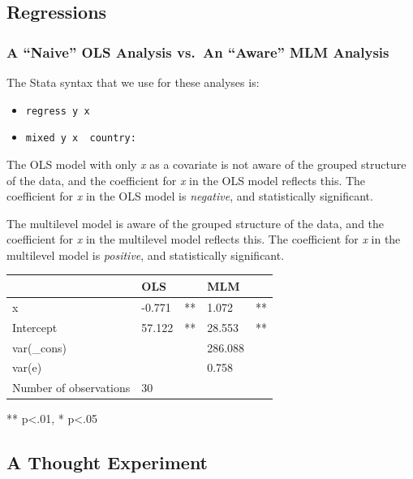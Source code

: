 \documentclass[
  letterpaper,
  DIV=11,
  numbers=noendperiod]{scrreprt}
\providecommand{\tightlist}{%
  \setlength{\itemsep}{0pt}\setlength{\parskip}{0pt}}\usepackage{longtable,booktabs,array}
\begin{document}
\hypertarget{regressions}{%
\subsection{Regressions}\label{regressions}}

\hypertarget{a-naive-ols-analysis-vs.-an-aware-mlm-analysis}{%
\subsubsection{A ``Naive'' OLS Analysis vs.~An ``Aware'' MLM
Analysis}\label{a-naive-ols-analysis-vs.-an-aware-mlm-analysis}}

The Stata syntax that we use for these analyses is:

\begin{itemize}
\tightlist
\item
  \texttt{regress\ y\ x}
\item
  \texttt{mixed\ y\ x\ \textbar{}\textbar{}\ country:}
\end{itemize}

The OLS model with only \emph{x} as a covariate is not aware of the
grouped structure of the data, and the coefficient for \emph{x} in the
OLS model reflects this. The coefficient for \emph{x} in the OLS model
is \emph{negative}, and statistically significant.

The multilevel model is aware of the grouped structure of the data, and
the coefficient for \emph{x} in the multilevel model reflects this. The
coefficient for \emph{x} in the multilevel model is \emph{positive}, and
statistically significant.

\begin{longtable}[]{@{}lllll@{}}
\toprule()
& OLS & & MLM & \\
\midrule()
\endhead
x & -0.771 & ** & 1.072 & ** \\
Intercept & 57.122 & ** & 28.553 & ** \\
var(\_cons) & & & 286.088 & \\
var(e) & & & 0.758 & \\
Number of observations & 30 & & & \\
\bottomrule()
\end{longtable}

** p\textless.01, * p\textless.05

\hypertarget{a-thought-experiment}{%
\subsection{A Thought Experiment}\label{a-thought-experiment}}
\end{document}
